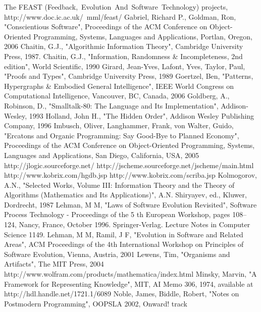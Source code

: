 \documentclass[10pt]{sigplanconf}
\begin{document}
\begin{thebibliography}{}
The FEAST (Feedback,~Evolution~And~Software~Technology) projects, http://www.doc.ic.ac.uk/~mml/feast/
Gabriel,  Richard P., Goldman, Ron, "Conscientious Software", Proceedings of the ACM Conference on Object-Oriented Programming, Systems, Languages and Applications, Portlan, Oregon, 2006
Chaitin, G.J., "Algorithmic Information Theory", Cambridge University Press, 1987.
Chaitin, G.J., "Information, Randomness \& Incompleteness, 2nd edition", World Scientific, 1990
Girard, Jean-Yves, Lafont, Yves, Taylor, Paul, "Proofs and Types", Cambridge University Press, 1989
Goertzel,  Ben, "Patterns, Hypergraphs \& Embodied General Intelligence", IEEE World Congress on Computational Intelligence, Vancouver, BC, Canada, 2006
Goldberg, A., Robinson, D.,  "Smalltalk-80: The Language and Its Implementation", Addison-Wesley, 1993
Holland, John H., "The Hidden Order", Addison Wesley Publishing Company, 1996
Imbusch, Oliver, Langhammer, Frank, von Walter, Guido, "Ercatons and Organic Programming: Say Good-Bye to Planned Economy", Proceedings of the ACM Conference on Object-Oriented Programming, Systems, Languages and Applications, San Diego, California, USA, 2005
 http://jlogic.sourceforge.net/
 http://jscheme.sourceforge.net/jscheme/main.html
 http://www.kobrix.com/hgdb.jsp
 http://www.kobrix.com/scriba.jsp
Kolmogorov, A.N., "Selected Works, Volume III: Information Theory and the Theory of Algorithms (Mathematics and Its Applications)", A.N. Shiryayev, ed., Kluwer, Dordrecht, 1987
Lehman, M M, "Laws of Software Evolution Revisited", Software Process Technology - Proceedings of the 5 th European Workshop, pages 108--124, Nancy, France, October 1996. Springer-Verlag. Lecture Notes in Computer Science 1149.
Lehman, M M, Ramil, J F, "Evolution in Software and Related Areas", ACM Proceedings of the 4th International Workshop on Principles of Software Evolution, Vienna, Austria, 2001
Lewens, Tim, "Organisms and Artifacts", The MIT Press, 2004
 http://www.wolfram.com/products/mathematica/index.html
Minsky, Marvin, "A Framework for Representing Knowledge", MIT, AI Memo 306, 1974, available at \\
http://hdl.handle.net/1721.1/6089
Noble, James, Biddle, Robert, "Notes on Postmodern Programming", OOPSLA 2002, Onward! track

\end{thebibliography}
\end{document}
